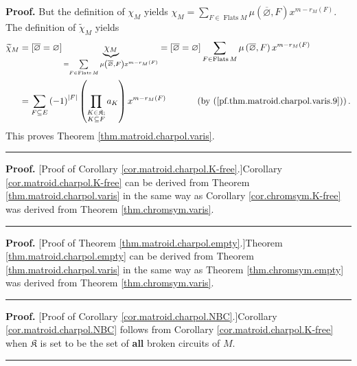 \documentclass[numbers=enddot,12pt,final,onecolumn,notitlepage]{scrartcl}%
\theoremstyle{definition}
\newenvironment{proof}[1][Proof]{\noindent\textbf{#1.} }{\ \rule{0.5em}{0.5em}}
\let\sumnonlimits\sum
\let\prodnonlimits\prod
\renewcommand{\sum}{\sumnonlimits\limits}
\renewcommand{\prod}{\prodnonlimits\limits}
\begin{document}
\begin{proof}
But the definition of $\chi_{M}$ yields $\chi_{M}=\sum_{F\in
\operatorname*{Flats}M}\mu\left(  \overline{\varnothing},F\right)
x^{m-r_{M}\left(  F\right)  }$. The definition of $\widetilde{\chi}_{M}$
yields%
\begin{align*}
\widetilde{\chi}_{M}  &  =\left[  \overline{\varnothing}=\varnothing\right]
\underbrace{\chi_{M}}_{=\sum_{F\in\operatorname*{Flats}M}\mu\left(
\overline{\varnothing},F\right)  x^{m-r_{M}\left(  F\right)  }}=\left[
\overline{\varnothing}=\varnothing\right]  \sum_{F\in\operatorname*{Flats}%
M}\mu\left(  \overline{\varnothing},F\right)  x^{m-r_{M}\left(  F\right)  }\\
&  =\sum_{F\subseteq E}\left(  -1\right)  ^{\left\vert F\right\vert }\left(
\prod_{\substack{K\in\mathfrak{K};\\K\subseteq F}}a_{K}\right)  x^{m-r_{M}%
\left(  F\right)  }\ \ \ \ \ \ \ \ \ \ \left(  \text{by
(\ref{pf.thm.matroid.charpol.varis.9})}\right)  .
\end{align*}
This proves Theorem \ref{thm.matroid.charpol.varis}.
\end{proof}

\begin{proof}
[Proof of Corollary \ref{cor.matroid.charpol.K-free}.]Corollary
\ref{cor.matroid.charpol.K-free} can be derived from Theorem
\ref{thm.matroid.charpol.varis} in the same way as Corollary
\ref{cor.chromsym.K-free} was derived from Theorem \ref{thm.chromsym.varis}.
\end{proof}

\begin{proof}
[Proof of Theorem \ref{thm.matroid.charpol.empty}.]Theorem
\ref{thm.matroid.charpol.empty} can be derived from Theorem
\ref{thm.matroid.charpol.varis} in the same way as Theorem
\ref{thm.chromsym.empty} was derived from Theorem \ref{thm.chromsym.varis}.
\end{proof}

\begin{proof}
[Proof of Corollary \ref{cor.matroid.charpol.NBC}.]Corollary
\ref{cor.matroid.charpol.NBC} follows from Corollary
\ref{cor.matroid.charpol.K-free} when $\mathfrak{K}$ is set to be the set of
\textbf{all} broken circuits of $M$.
\end{proof}
\end{document}
